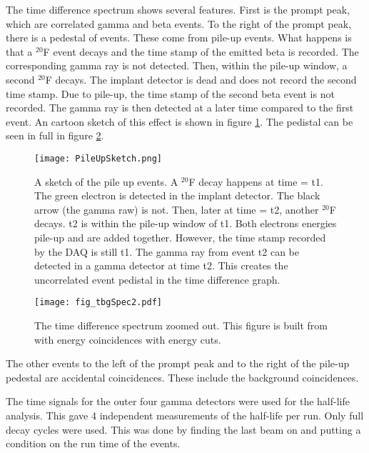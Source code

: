 \documentclass[MaxHughesThesis.tex]{subfiles}
\begin{document}
The time difference spectrum shows several features.
First is the prompt peak, which are correlated gamma and beta events. 
To the right of the prompt peak, there is a pedestal of events.
These come from pile-up events.
What happens is that a $^{20}$F event decays and the time stamp of the emitted beta is recorded.
The corresponding gamma ray is not detected.
Then, within the pile-up window, a second $^{20}$F decays.  
The implant detector is dead and does not record the second time stamp.
Due to pile-up, the time stamp of the second beta event is not recorded.
The gamma ray is then detected at a later time compared to the first event.
An cartoon sketch of this effect is shown in figure \ref{fig:PileUp}.
The pedistal can be seen in full in figure \ref{fig:timediff2}.

\begin{figure}
	\centerline{\texttt{[image: PileUpSketch.png]}}
	\caption{A sketch of the pile up events.
		 A $^{20}$F decay happens at time = t1.
		 The green electron is detected in the implant detector.
		 The black arrow (the gamma raw) is not.
		 Then, later at time = t2, another $^{20}$F decays.
		 t2 is within the pile-up window of t1.
		 Both electrons energies pile-up and are added together.
		 However, the time stamp recorded by the DAQ is still t1.
		 The gamma ray from event t2 can be detected in a gamma detector at time t2.
		 This creates the uncorrelated event pedistal in the time difference graph.
		 }
	\label{fig:PileUp}
\end{figure}

\begin{figure}
	\centerline{\texttt{[image: fig\_tbgSpec2.pdf]}}	
	\caption{The time difference spectrum zoomed out.
		 This figure is built from with energy coincidences with energy cuts.}
	\label{fig:timediff2}
\end{figure}

The other events to the left of the prompt peak and to the right of the pile-up pedestal are accidental coincidences.
These include the background coincidences.

The time signals for the outer four gamma detectors were used for the half-life analysis.
This gave 4 independent measurements of the half-life per run. 
Only full decay cycles were used. 
This was done by finding the last beam on and putting a condition on the run time of the events.
\end{document}
